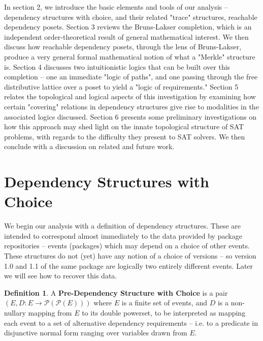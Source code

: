 \documentclass[hoptionsi,review,format=acmsmall]{acmart}
\theoremstyle{definition}
\newtheorem{definition}{Definition}[section]
\newcommand{\Pc}{\mathcal{P}}
\begin{document}
In section 2, we introduce the basic elements and tools of our analysis -- dependency structures with choice, and their related "trace" structures, reachable dependency posets. Section 3 reviews the Bruns-Lakser completion, which is an independent order-theoretical result of general mathematical interest. We then discuss how reachable dependency posets, through the lens of Bruns-Lakser, produce a very general formal mathematical notion of what a "Merkle" structure is. Section 4 discusses two intuitionistic logics that can be built over this completion -- one an immediate "logic of paths", and one passing through the free distributive lattice over a poset to yield a "logic of requirements." Section 5 relates the topological and logical aspects of this investigation by examining how certain "covering" relations in dependency structures give rise to modalities in the associated logics discussed. Section 6 presents some preliminary investigations on how this approach may shed light on the innate topological structure of SAT problems, with regards to the difficulty they present to SAT solvers. We then conclude with a discussion on related and future work.

\section{Dependency Structures with Choice}
We begin our analysis with a definition of dependency structures. These are intended to correspond almost immediately to the data provided by package repositories -- events (packages) which may depend on a choice of other events. These structures do not (yet) have any notion of a choice of versions -- so version 1.0 and 1.1 of the same package are logically two entirely different events. Later we will see how to recover this data.

\begin{definition}
A \textbf{Pre-Dependency Structure with Choice} is a pair \((E, D : E \rightarrow \Pc(\Pc(E)))\) where \(E\) is a finite set of events, and \(D\) is a non-nullary mapping from \(E\) to its double powerset, to be interpreted as mapping each event to a set of alternative dependency requirements -- i.e. to a predicate in disjunctive normal form ranging over variables drawn from \(E\).
\end{definition}
\end{document}

